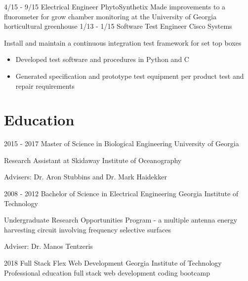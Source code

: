 \documentclass[]{cv}
\begin{document}
\begin{body}
\begin{entrylist}
{		}
		\entry
		{4/15 - 9/15}
		{Electrical Engineer}
		{PhytoSynthetix}
		{Made improvements to a fluorometer for grow chamber monitoring at the University of Georgia horticultural greenhouse}
		\entry
		{1/13 - 1/15}
		{Software Test Engineer}
		{Cisco Systems}
		{Install and maintain a continuous integration test framework for set top boxes
			\begin{itemize}
				\item {Developed test software and procedures in Python and C}
				\item {Generated specification and prototype test equipment per product test and repair requirements}
			\end{itemize}
		}
	\end{entrylist}
	\section{Education \vspace{0.1cm}}
	\par
	\begin{entrylist}
		\entry
		{2015 - 2017}
		{Master of Science in Biological Engineering}
		{University of Georgia}
		{Research Assistant at Skidaway Institute of Oceanography
			\begin{description}
				\item {Advisers: Dr. Aron Stubbins and Dr. Mark Haidekker}
			\end{description}}
		\entry
		{2008 - 2012}
		{Bachelor of Science in Electrical Engineering}
		{Georgia Institute of Technology}
		{
			Undergraduate Research Opportunities Program - a multiple antenna energy harvesting circuit involving frequency selective surfaces
			\begin{description}
				\item {Adviser: Dr. Manos Tentzeris}
			\end{description}
		}
		\entry
		{2018}
		{Full Stack Flex Web Development}
		{Georgia Institute of Technology}
		{Professional education full stack web development coding bootcamp}
	\end{entrylist}
\end{body}
\end{document}
